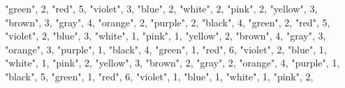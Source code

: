 \documentclass[
]{article}
\newenvironment{Shaded}{\begin{snugshade}}{\end{snugshade}}
\newcommand{\DecValTok}[1]{\textcolor[rgb]{0.00,0.00,0.81}{#1}}
\newcommand{\NormalTok}[1]{#1}
\newcommand{\StringTok}[1]{\textcolor[rgb]{0.31,0.60,0.02}{#1}}
\begin{document}
\begin{Shaded}
\begin{Highlighting}[]
  \StringTok{"green"}\NormalTok{, }\DecValTok{2}\NormalTok{,}
  \StringTok{"red"}\NormalTok{, }\DecValTok{5}\NormalTok{,}
  \StringTok{"violet"}\NormalTok{, }\DecValTok{3}\NormalTok{,}
  \StringTok{"blue"}\NormalTok{, }\DecValTok{2}\NormalTok{,}
  \StringTok{"white"}\NormalTok{, }\DecValTok{2}\NormalTok{,}
  \StringTok{"pink"}\NormalTok{, }\DecValTok{2}\NormalTok{,}
  \StringTok{"yellow"}\NormalTok{, }\DecValTok{3}\NormalTok{,}
  \StringTok{"brown"}\NormalTok{, }\DecValTok{3}\NormalTok{, }
  \StringTok{"gray"}\NormalTok{, }\DecValTok{4}\NormalTok{,}
  \StringTok{"orange"}\NormalTok{, }\DecValTok{2}\NormalTok{,}
  \StringTok{"purple"}\NormalTok{, }\DecValTok{2}\NormalTok{,}
    \StringTok{"black"}\NormalTok{, }\DecValTok{4}\NormalTok{,}
  \StringTok{"green"}\NormalTok{, }\DecValTok{2}\NormalTok{,}
  \StringTok{"red"}\NormalTok{, }\DecValTok{5}\NormalTok{,}
  \StringTok{"violet"}\NormalTok{, }\DecValTok{2}\NormalTok{,}
  \StringTok{"blue"}\NormalTok{, }\DecValTok{3}\NormalTok{,}
  \StringTok{"white"}\NormalTok{, }\DecValTok{1}\NormalTok{,}
  \StringTok{"pink"}\NormalTok{, }\DecValTok{1}\NormalTok{,}
  \StringTok{"yellow"}\NormalTok{, }\DecValTok{2}\NormalTok{,}
  \StringTok{"brown"}\NormalTok{, }\DecValTok{4}\NormalTok{,}
  \StringTok{"gray"}\NormalTok{, }\DecValTok{3}\NormalTok{,}
  \StringTok{"orange"}\NormalTok{, }\DecValTok{3}\NormalTok{,}
  \StringTok{"purple"}\NormalTok{, }\DecValTok{1}\NormalTok{,}
    \StringTok{"black"}\NormalTok{, }\DecValTok{4}\NormalTok{,}
  \StringTok{"green"}\NormalTok{, }\DecValTok{1}\NormalTok{,}
  \StringTok{"red"}\NormalTok{, }\DecValTok{6}\NormalTok{,}
  \StringTok{"violet"}\NormalTok{, }\DecValTok{2}\NormalTok{,}
  \StringTok{"blue"}\NormalTok{, }\DecValTok{1}\NormalTok{,}
  \StringTok{"white"}\NormalTok{, }\DecValTok{1}\NormalTok{,}
  \StringTok{"pink"}\NormalTok{, }\DecValTok{2}\NormalTok{,}
  \StringTok{"yellow"}\NormalTok{, }\DecValTok{3}\NormalTok{,}
  \StringTok{"brown"}\NormalTok{, }\DecValTok{2}\NormalTok{,}
  \StringTok{"gray"}\NormalTok{, }\DecValTok{2}\NormalTok{,}
  \StringTok{"orange"}\NormalTok{, }\DecValTok{4}\NormalTok{,}
  \StringTok{"purple"}\NormalTok{, }\DecValTok{1}\NormalTok{,}
    \StringTok{"black"}\NormalTok{, }\DecValTok{5}\NormalTok{,}
  \StringTok{"green"}\NormalTok{, }\DecValTok{1}\NormalTok{,}
  \StringTok{"red"}\NormalTok{, }\DecValTok{6}\NormalTok{,}
  \StringTok{"violet"}\NormalTok{, }\DecValTok{1}\NormalTok{,}
  \StringTok{"blue"}\NormalTok{, }\DecValTok{1}\NormalTok{,}
  \StringTok{"white"}\NormalTok{, }\DecValTok{1}\NormalTok{,}
  \StringTok{"pink"}\NormalTok{, }\DecValTok{2}\NormalTok{,}

\end{Highlighting}
\end{Shaded}
\end{document}
